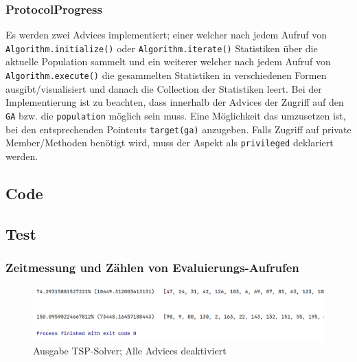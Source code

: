 \documentclass[german,notitlepage,smartquotes]{hgbreport}
\begin{document}
\subsubsection{ProtocolProgress}

Es werden zwei Advices implementiert; einer welcher nach jedem Aufruf von \texttt{Algorithm\-.\-initialize()} oder \texttt{Algorithm.iterate()} Statistiken über die aktuelle Population sammelt und ein weiterer welcher nach jedem Aufruf von \texttt{Algorithm.execute()} die gesammelten Statistiken in verschiedenen Formen ausgibt/visualisiert und danach die Collection der Statistiken leert. Bei der Implementierung ist zu beachten, dass innerhalb der Advices der Zugriff auf den \texttt{GA} bzw. die \texttt{population} möglich sein muss. Eine Möglichkeit das umzusetzen ist, bei den entsprechenden Pointcuts \texttt{target(ga)} anzugeben. Falls Zugriff auf private Member/Methoden benötigt wird, muss der Aspekt als \texttt{privileged} deklariert werden.

\subsection{Code}








\clearpage

\subsection{Test}

\subsubsection{Zeitmessung und Zählen von Evaluierungs-Aufrufen}

\begin{figure}[h]
\centering
\includegraphics[width=.9\textwidth]{tsp-test-00}
\caption{Ausgabe TSP-Solver; Alle Advices deaktiviert}
\label{tsp-test-00}
\end{figure}
\end{document}
